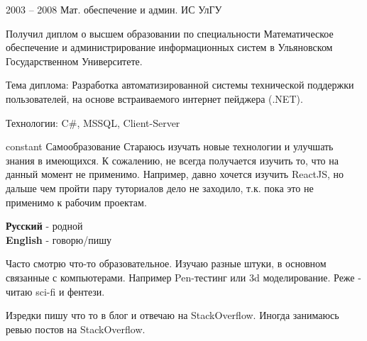 \documentclass[10pt]{tpl/developercv} %
\begin{document}
\begin{entrylist}
	\entry
		{2003 -- 2008}
		{Мат. обеспечение и админ. ИС}
		{УлГУ}
		{Получил диплом о высшем образовании по специальности Математическое обеспечение и администрирование информационных систем в Ульяновском Государственном Университете.

		Тема диплома: Разработка автоматизированной системы технической поддержки пользователей, на основе встраиваемого интернет пейджера (.NET).

		Технологии: C\#, MSSQL, Client-Server
		}
	\entry
		{constant}
		{Самообразование}
		{}
		{Стараюсь изучать новые технологии и улучшать знания в имеющихся. К сожалению, не всегда получается изучить то, что на данный момент не применимо. Например, давно хочется изучить ReactJS, но дальше чем пройти пару туториалов дело не заходило, т.к. пока это не применимо к рабочим проектам.}
\end{entrylist}


\begin{minipage}[t]{0.3\textwidth}
	\vspace{-\baselineskip} %


	\textbf{Русский} - родной\\
	\textbf{English} - говорю/пишу\\
\end{minipage}
\hfill
\begin{minipage}[t]{0.3\textwidth}
	\vspace{-\baselineskip} %


	Часто смотрю что-то образовательное. Изучаю разные штуки, в основном связанные с компьютерами. Например Pen-тестинг или 3d моделирование.
	Реже - читаю sci-fi и фентези.
\end{minipage}
\hfill
\begin{minipage}[t]{0.3\textwidth}
	\vspace{-\baselineskip} %


	Изредки пишу что то в блог и отвечаю на StackOverflow. Иногда занимаюсь ревью постов на StackOverflow.
\end{minipage}
\end{document}
